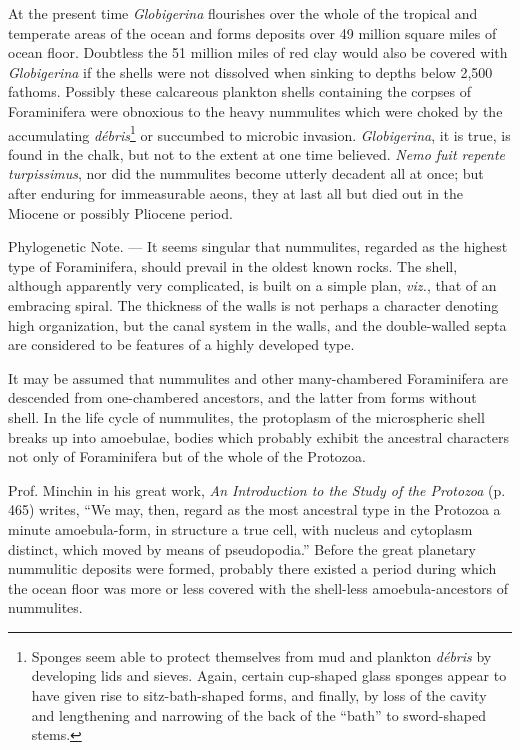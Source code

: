 \documentclass[a4paper, 12pt, oneside]{article}
\begin{document}
At the present time \emph{Globigerina} flourishes over the whole of the tropical and temperate areas of the ocean and forms deposits over 49 million square miles of ocean floor. Doubtless the 51 million miles of red clay would also be covered with \emph{Globigerina} if the shells were not dissolved when sinking to depths below 2,500 fathoms. Possibly these calcareous plankton shells containing the corpses of Foraminifera were obnoxious to the heavy nummulites which were choked by the accumulating \emph{débris}\footnote{Sponges seem able to protect themselves from mud and plankton \emph{débris} by developing lids and sieves. Again, certain cup-shaped glass sponges appear to have given rise to sitz-bath-shaped forms, and finally, by loss of the cavity and lengthening and narrowing of the back of the ``bath'' to sword-shaped stems.} or succumbed to microbic invasion. \emph{Globigerina}, it is true, is found in the chalk, but not to the extent at one time believed. \emph{Nemo fuit repente turpissimus}, nor did the nummulites become utterly decadent all at once; but after enduring for immeasurable aeons, they at last all but died out in the Miocene or possibly Pliocene period.

Phylogenetic Note. --- It seems singular that nummulites, regarded as the highest type of Foraminifera, should prevail in the oldest known rocks. The shell, although apparently very complicated, is built on a simple plan, \emph{viz.}, that of an embracing spiral. The thickness of the walls is not perhaps a character denoting high organization, but the canal system in the walls, and the double-walled septa are considered to be features of a highly developed type.

It may be assumed that nummulites and other many-chambered Foraminifera are descended from one-chambered ancestors, and the latter from forms without shell. In the life cycle of nummulites, the protoplasm of the microspheric shell breaks up into amoebulae, bodies which probably exhibit the ancestral characters not only of Foraminifera but of the whole of the Protozoa.

Prof. Minchin in his great work, \emph{An Introduction to the Study of the Protozoa} (p. 465) writes, ``We may, then, regard as the most ancestral type in the Protozoa a minute amoebula-form, in structure a true cell, with nucleus and cytoplasm distinct, which moved by means of pseudopodia.'' Before the great planetary nummulitic deposits were formed, probably there existed a period during which the ocean floor was more or less covered with the shell-less amoebula-ancestors of nummulites.
\end{document}
